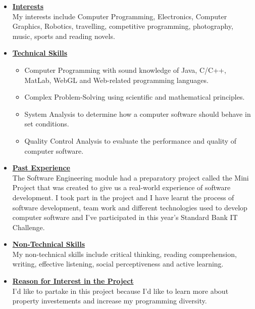 \documentclass[a4paper,12pt]{article}
\begin{document}
\begin{itemize}
\item {\Large \underline{\textbf{Interests}}}\\[0.2cm]
My interests include Computer Programming, Electronics, Computer Graphics, Robotics, travelling, competitive programming, photography, music, sports and reading novels.
\\
\item {\Large \underline{\textbf{Technical Skills}}}

	\begin{itemize}
		\item Computer Programming with sound knowledge of Java, C/C++, MatLab, WebGL and Web-related 					programming languages.
		\item Complex Problem-Solving using scientific and mathematical principles.
		\item System Analysis to determine how a computer software should behave in set conditions.
		\item Quality Control Analysis to evaluate the performance and quality of computer software.
	\end{itemize}
\bigskip
\item {\Large \underline{\textbf{Past Experience}}}\\[0.2cm]
The Software Engineering module had a preparatory project called the Mini Project that was created to give us a real-world experience of software development. I took part in the project and I have learnt the process of software development, team work and different technologies used to develop computer software and I've participated in this year's Standard Bank IT Challenge. 
\\
\item {\Large \underline{\textbf{Non-Technical Skills}}}\\[0.2cm]
My non-technical skills include critical thinking, reading comprehension, writing, effective listening, social perceptiveness and active learning. 
\\
\item {\Large \underline{\textbf{Reason for Interest in the Project}}}\\[0.2cm]
I'd like to partake in this project because I'd like to learn more about property investements and increase my programming diversity.

\end{itemize}
\newpage
\end{document}
